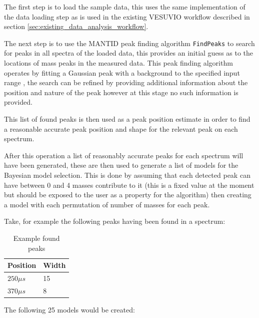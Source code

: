 \documentclass[a4paper]{article}
\begin{document}
The first step is to load the sample data, this uses the same implementation of
the data loading step as is used in the existing VESUVIO workflow described in
section \ref{sec:existing_data_analysis_workflow}.

The next step is to use the \gls*{MANTID} peak finding algorithm
\texttt{FindPeaks} to search for peaks in all spectra of the loaded data, this
provides an initial guess as to the locations of mass peaks in the measured
data. This peak finding algorithm operates by fitting a Gaussian peak with a
background to the specified input range \cite{Mariscotti1967}, the search can be
refined by providing additional information about the position and nature of the
peak however at this stage no such information is provided.

This list of found peaks is then used as a peak position estimate in order to
find a reasonable accurate peak position and shape for the relevant peak on each
spectrum.

After this operation a list of reasonably accurate peaks for each spectrum will
have been generated, these are then used to generate a list of models for the
Bayesian model selection. This is done by assuming that each detected peak can
have between 0 and 4 masses contribute to it (this is a fixed value at the
moment but should be exposed to the user as a property for the algorithm) then
creating a model with each permutation of number of masses for each peak.

Take, for example the following peaks having been found in a spectrum:

\begin{table}[h!]
  \centering
  \begin{tabular}{@{}ll@{}}
    \toprule
    Position    & Width \\
    \midrule
    $250 \mu s$ & 15    \\
    $370 \mu s$ & 8     \\
    \bottomrule
  \end{tabular}
  \caption{Example found peaks}
  \label{tab:ba_example_peaks}
\end{table}
\FloatBarrier

The following 25 models would be created:
\end{document}
